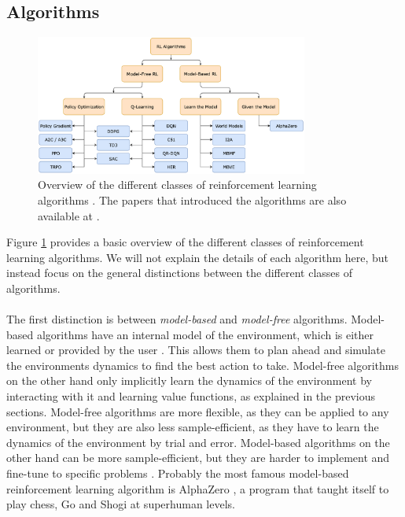 \subsection{Algorithms}
\label{subsec:rl-algorithms}
\begin{figure}[h]
    \centering
    \includegraphics[width=0.8\textwidth]{openai_algorithms}
    \caption{Overview of the different classes of reinforcement learning algorithms \cite{openai_spinning_up_rl_part2}. The papers that introduced the algorithms are also available at \cite{openai_spinning_up_rl_part2}.}
    \label{fig:rl-algorithms}
\end{figure}
Figure \ref{fig:rl-algorithms} provides a basic overview of the different classes of reinforcement learning algorithms. We will not explain the details of each algorithm here, but instead focus on the general distinctions between the different classes of algorithms.
\\
\\
The first distinction is between \textit{model-based} and \textit{model-free} algorithms. Model-based algorithms have an internal model of the environment, which is either learned or provided by the user \cite{openai_spinning_up_rl_part2}. This allows them to plan ahead and simulate the environments dynamics to find the best action to take. Model-free algorithms on the other hand only implicitly learn the dynamics of the environment by interacting with it and learning value functions, as explained in the previous sections. Model-free algorithms are more flexible, as they can be applied to any environment, but they are also less sample-efficient, as they have to learn the dynamics of the environment by trial and error. Model-based algorithms on the other hand can be more sample-efficient, but they are harder to implement and fine-tune to specific problems \cite{openai_spinning_up_rl_part2}. Probably the most famous model-based reinforcement learning algorithm is AlphaZero \cite{silver_mastering_2017}, a program that taught itself to play chess, Go and Shogi at superhuman levels.
